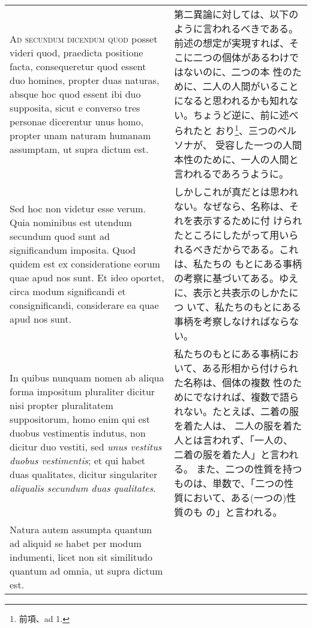 \documentclass[10pt]{jsarticle} %
\begin{document}
\begin{longtable}{p{21em}p{21em}}
{\scshape Ad secundum dicendum quod} posset videri quod, praedicta positione facta,
consequeretur quod essent duo homines, propter duas naturas, absque hoc
quod essent ibi duo supposita, sicut e converso tres personae dicerentur
unus homo, propter unam naturam humanam assumptam, ut supra dictum
est. 

&

第二異論に対しては、以下のように言われるべきである。
前述の想定が実現すれば、そこに二つの個体があるわけではないのに、二つの本
 性のために、二人の人間がいることになると思われるかも知れない。ちょうど逆に、前に述べられたと
 おり\footnote{前項、ad 1.}、三つのペルソナが、
 受容した一つの人間本性のために、一人の人間と言われるであろうように。


\\

Sed hoc non videtur esse verum. Quia nominibus est utendum secundum
quod sunt ad significandum imposita. Quod quidem est ex consideratione
eorum quae apud nos sunt. Et ideo oportet, circa modum significandi et
consignificandi, considerare ea quae apud nos sunt. 


&

しかしこれが真だとは思われない。なぜなら、名称は、それを表示するために付
 けられたところにしたがって用いられるべきだからである。これは、私たちの
 もとにある事柄の考察に基づいてある。ゆえに、表示と共表示のしかたにつ
 いて、私たちのもとにある事柄を考察しなければならない。


\\



In quibus nunquam
nomen ab aliqua forma impositum pluraliter dicitur nisi propter
pluralitatem suppositorum, homo enim qui est duobus vestimentis indutus,
non dicitur duo vestiti, sed {\itshape unus vestitus duobus vestimentis}; et qui
habet duas qualitates, dicitur singulariter {\itshape aliqualis secundum duas
qualitates}. 


&

私たちのもとにある事柄において、ある形相から付けられた名称は、個体の複数
 性のためにでなければ、複数で語られない。たとえば、二着の服を着た人は、
 二人の服を着た人とは言われず、「一人の、二着の服を着た人」と言われる。
 また、二つの性質を持つものは、単数で、「二つの性質において、ある(一つの)性質のも
 の」と言われる。

\\


Natura autem assumpta quantum ad aliquid se habet per modum
indumenti, licet non sit similitudo quantum ad omnia, ut supra dictum
est. 



\end{longtable}
\end{document}
